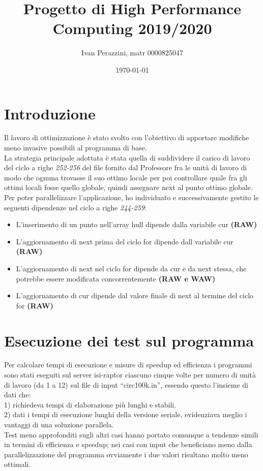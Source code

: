 \documentclass[a4paper, 12pt]{article}
\title{\textbf{Progetto di High Performance Computing 2019/2020}}
\author{Ivan Perazzini, matr 0000825047}
\date{\today}
\begin{document}
    
    
    \maketitle

    \section*{Introduzione}
    Il lavoro di ottimizzazione è stato svolto con l’obiettivo di apportare modifiche meno invasive possibili al programma di base. \\
    La strategia principale adottata è stata quella di suddividere il carico di lavoro del ciclo a righe \emph{252-256} del file fornito dal Professore fra le unità di lavoro
    di modo che ognuna trovasse il suo ottimo locale per poi controllare quale fra gli ottimi locali fosse quello globale, quindi assegnare next al punto ottimo globale. \\
    Per poter parallelizzare l’applicazione, ho individuato e successivamente gestito le seguenti dipendenze nel ciclo a righe \emph{244-259}:
    \begin{itemize}
	    \item L’inserimento di un punto nell’array hull dipende dalla variabile cur \textbf{(RAW)}
	    \item L’aggiornamento di next prima del ciclo for dipende dall variabile cur \textbf{(RAW)}
	    \item L’aggiornamento di next nel ciclo for dipende da cur e da next stessa, che potrebbe essere modificata concorrentemente \textbf{(RAW e WAW)}
	    \item L’aggiornamento di cur dipende dal valore finale di next al termine del ciclo for \textbf{(RAW)}
    \end{itemize}

    \section*{Esecuzione dei test sul programma}
    Per calcolare tempi di esecuzione e misure di speedup ed efficienza i programmi sono stati eseguiti sul server isi-raptor ciascuno cinque volte per numero di unità 
    di lavoro (da 1 a 12) sul file di input “circ100k.in”, essendo questo l’insieme di dati che: \\
    1) richiedeva tempi di elaborazione più lunghi e stabili. \\
    2) dati i tempi di esecuzione lunghi della versione seriale, evidenziava meglio i vantaggi di una soluzione parallela. \\
    Test meno approfonditi sugli altri casi hanno portato comunque a tendenze simili in termini di efficienza e speedup; nei casi con input che beneficiano meno dalla
    parallelizzazione del programma ovviamente i due valori risultano molto meno ottimali.
\end{document}
